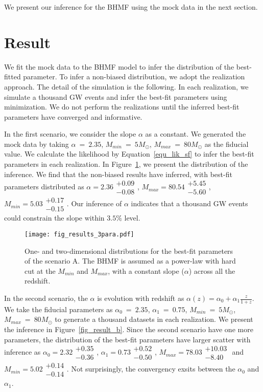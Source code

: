 \documentclass[twocolumn]{aastex62}
\begin{document}
 We present our inference for the BHMF using the mock data in the next section. 


\vspace{1cm}
\section{Result}\label{sec_result}
We fit the mock data to the BHMF model to infer the distribution of the best-fitted parameter. To infer a non-biased distribution, we adopt the realization approach. The detail of the simulation is the following. In each realization, we simulate a thousand GW events and infer the best-fit parameters using minimization. We do not perform the realizations until the inferred best-fit parameters have converged and informative. 

In the first scenario, we consider the slope $\alpha$ as a constant. We generated the mock data by taking $\alpha~=~2.35$, $M_{min}~=~5M_{\odot}$, $M_{max}~=~80M_{\odot}$ as the fiducial value. We calculate the likelihood by Equation~\ref{equ_lik_sf} to infer the best-fit parameters in each realization. In Figure~\ref{fig_result_a}, we present the distribution of the inference. We find that the non-biased results have inferred, with  best-fit parameters distributed as $\alpha = 2.36\substack{+0.09\\-0.08}$, $M_{max} = 80.54\substack{+5.45\\-5.60}$,  $M_{min} = 5.03\substack{+0.17\\-0.15}$. Our inference of $\alpha$ indicates that a thousand GW events could constrain the slope within $3.5\%$ level.

\begin{figure}%
\texttt{[image: fig\_results\_3para.pdf]}
\caption{
One- and two-dimensional distributions for the best-fit parameters of the scenario A. The BHMF is assumed as a power-law with hard cut at the $M_{min}$ and $M_{max}$, with a constant slope ($\alpha$) across all the redshift.
}
\label{fig_result_a}
\end{figure}

In the second scenario, the $\alpha$ is evolution with redshift as $\alpha(z) = \alpha_0 + \alpha_1\frac{z}{1+z}$. We take the fiducial parameters as $\alpha_0~=~2.35$, $\alpha_1~=~0.75$, $M_{min}~=~5M_{\odot}$, $M_{max}~=~80M_{\odot}$ to generate a thousand datasets in each realization. We present the inference in Figure~\ref{fig_result_b}. Since the second scenario have one more parameters, the distribution of the best-fit parameters have larger scatter with inference as $\alpha_0 = 2.32\substack{+0.35\\-0.36}$, $\alpha_1 = 0.73\substack{+0.52\\-0.50}$, $M_{max} = 78.03\substack{+10.03\\-8.40}$ and  $M_{min} = 5.02\substack{+0.14\\-0.14}$. Not surprisingly, the convergency exsits between the $\alpha_0$ and $\alpha_1$.
\end{document}
